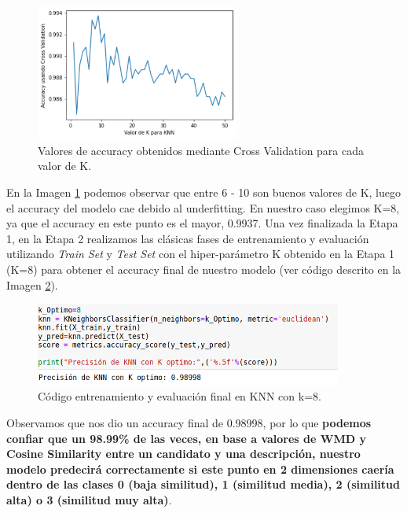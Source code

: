 \documentclass[12pt,a4paper]{article}
\begin{document}
\begin{sloppypar}
\begin{figure}[H]   
\centering
\includegraphics[width=0.6\textwidth]{images/implementacion_5/Cross_val_accuracy.png}
\captionsetup{justification=centering,margin=2cm}
\caption{Valores de accuracy obtenidos mediante Cross Validation para cada valor de K.}
\label{fig:Cross_val_accuracy}
\end{figure}

En la Imagen \ref{fig:Cross_val_accuracy} podemos observar que entre 6 - 10 son buenos valores de K, luego el accuracy del modelo cae debido al underfitting. En nuestro caso elegimos K=8, ya que el accuracy en este punto es el mayor, 0.9937. 
Una vez finalizada la Etapa 1, en la Etapa 2 realizamos las clásicas fases de entrenamiento y evaluación utilizando \textit{Train Set} y \textit{Test Set} con el hiper-parámetro K obtenido en la Etapa 1 (K=8) para obtener el accuracy final de nuestro modelo (ver código descrito en la Imagen \ref{fig:train_knn_con_k_8}).

\begin{figure}[H]   
\centering
\includegraphics[width=0.9\textwidth]{images/implementacion_5/train_knn_con_k_8.png}
\caption{Código entrenamiento y evaluación final en KNN con k=8.}
\label{fig:train_knn_con_k_8}
\end{figure}

Observamos que nos dio un accuracy final de 0.98998, por lo que \textbf{podemos confiar que un 98.99\% de las veces, en base a valores de WMD y Cosine Similarity entre un candidato y una descripción, nuestro modelo predecirá correctamente si este punto en 2 dimensiones caería dentro de las clases 0 (baja similitud), 1 (similitud media), 2 (similitud alta) o 3 (similitud muy alta)}. 


\end{sloppypar}
\end{document}
